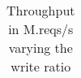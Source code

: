 \begin{table}[t]
{\begin{tabular}{c|c|c|c|c|c|c|c|}



\end{tabular}%
 }
\caption{Throughput in M.reqs/s varying the write ratio}
\label{tab:all-perf}
\end{table}